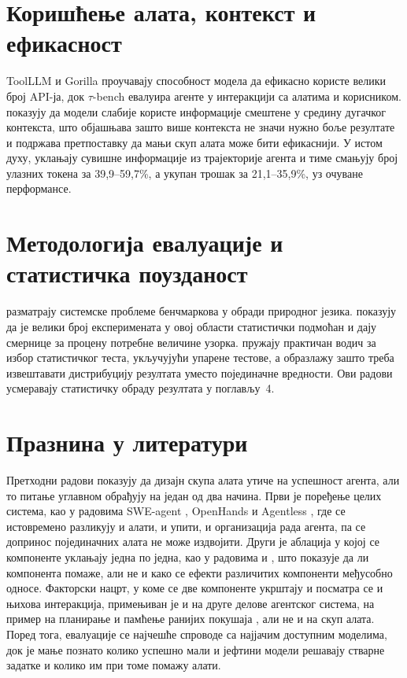 \documentclass[12pt,a4paper]{report}
\begin{document}
	\section{Коришћење алата, контекст и ефикасност}

	ToolLLM \parencite{qin2023toolllm} и Gorilla \parencite{patil2023gorilla}
	проучавају способност модела да ефикасно користе велики број API-ја, док
	$\tau$-bench \parencite{yao2024taubench} евалуира агенте у интеракцији са
	алатима и корисником. \textcite{liu2024lostinthemiddle} показују да модели
	слабије користе информације смештене у средину дугачког контекста, што
	објашњава зашто више контекста не значи нужно боље резултате и подржава
	претпоставку да мањи скуп алата може бити ефикаснији. У истом духу,
	\textcite{xiao2025trajectory} уклањају сувишне информације из трајекторије
	агента и тиме смањују број улазних токена за 39,9--59,7\%, а укупан трошак
	за 21,1--35,9\%, уз очуване перформансе.

	\section{Методологија евалуације и статистичка поузданост}

	\textcite{bowman2021fix} разматрају системске проблеме бенчмаркова у обради
	природног језика. \textcite{card2020littlepower} показују да је велики број
	експеримената у овој области статистички подмоћан и дају смернице за
	процену потребне величине узорка. \textcite{dror2018hitchhiker} пружају
	практичан водич за избор статистичког теста, укључујући упарене тестове, а
	\textcite{reimers2017distributions} образлажу зашто треба извештавати
	дистрибуцију резултата уместо појединачне вредности. Ови радови усмеравају
	статистичку обраду резултата у поглављу~4.

	\section{Празнина у литератури}

	Претходни радови показују да дизајн скупа алата утиче на успешност агента,
	али то питање углавном обрађују на један од два начина. Први је поређење
	целих система, као у радовима SWE-agent \parencite{yang2024sweagent},
	OpenHands \parencite{wang2025openhands} и Agentless
	\parencite{xia2025agentless}, где се истовремено разликују и алати, и
	упити, и организација рада агента, па се допринос појединачних алата не
	може издвојити. Други је аблација у којој се компоненте уклањају једна по
	једна, као у радовима \textcite{yang2024sweagent} и
	\textcite{phan2024hyperagent}, што показује да ли компонента помаже, али не
	и како се ефекти различитих компоненти међусобно односе. Факторски нацрт, у
	коме се две компоненте укрштају и посматра се и њихова интеракција,
	примењиван је и на друге делове агентског система, на пример на планирање и
	памћење ранијих покушаја \parencite{zhang2026pmcoder}, али не и на скуп
	алата. Поред тога,
	евалуације се најчешће спроводе са најјачим доступним моделима, док је
	мање познато колико успешно мали и јефтини модели решавају стварне задатке
	и колико им при томе помажу алати.
\end{document}
